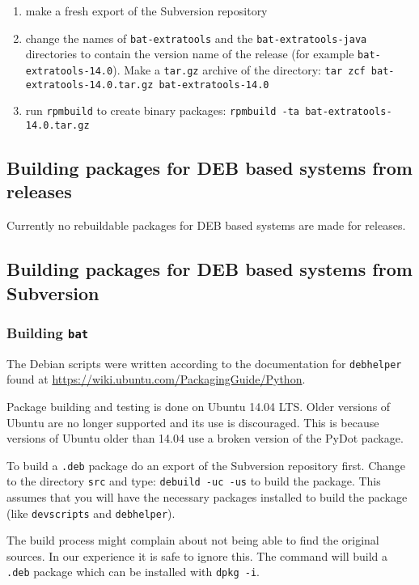 \documentclass[10pt]{article}
\begin{document}
\begin{enumerate}
\item make a fresh export of the Subversion repository
\item change the names of \texttt{bat-extratools} and the
\texttt{bat-extratools-java} directories to contain the version name of the
release (for example \texttt{bat-extratools-14.0}). Make a \texttt{tar.gz}
archive of the directory:
\texttt{tar zcf bat-extratools-14.0.tar.gz bat-extratools-14.0}
\item run \texttt{rpmbuild} to create binary packages:
\texttt{rpmbuild -ta bat-extratools-14.0.tar.gz}
\end{enumerate}

\subsection{Building packages for DEB based systems from releases}

Currently no rebuildable packages for DEB based systems are made for releases.

\subsection{Building packages for DEB based systems from Subversion}

\subsubsection{Building \texttt{bat}}

The Debian scripts were written according to the documentation for
\texttt{debhelper} found at \url{https://wiki.ubuntu.com/PackagingGuide/Python}.

Package building and testing is done on Ubuntu 14.04 LTS. Older versions of
Ubuntu are no longer supported and its use is discouraged. This is because
versions of Ubuntu older than 14.04 use a broken version of the PyDot package.

To build a \texttt{.deb} package do an export of the Subversion repository
first.  Change to the directory \texttt{src} and type:
\texttt{debuild -uc -us} to build the package. This assumes that you will have
the necessary packages installed to build the package (like \texttt{devscripts}
and \texttt{debhelper}).

The build process might complain about not being able to find the original
sources. In our experience it is safe to ignore this. The command will build a
\texttt{.deb} package which can be installed with \texttt{dpkg -i}.
\end{document}
